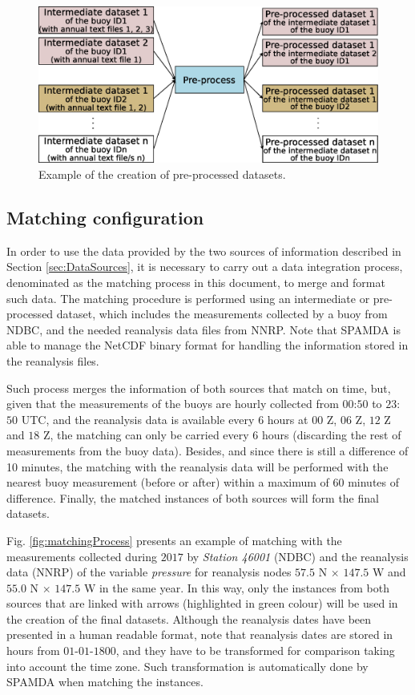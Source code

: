 \documentclass[review]{elsarticle}
\begin{document}
				\begin{figure}[ht!]
					\centering
					\includegraphics[scale=0.36]{figures/FigurePreprocess.eps}
					\caption{Example of the creation of pre-processed datasets.}
					\label{fig:preprocess}
				\end{figure}
				
				
			\subsection{Matching configuration}
			\label{sec:matching_conf}
			
				In order to use the data provided by the two sources of information described in Section \ref{sec:DataSources}, it is necessary to carry out a data integration process, denominated as the matching process in this document, to merge and format such data. The matching procedure is performed using an intermediate or pre-processed dataset, which includes the measurements collected by a buoy from NDBC, and the needed reanalysis data files from NNRP. Note that SPAMDA is able to manage the NetCDF binary format for handling the information stored in the reanalysis files.
				
				Such process merges the information of both sources that match on time, but, given that the measurements of the buoys are hourly collected from $00$:$50$ to $23$:$50$ UTC, and the reanalysis data is available every $6$ hours at $00$ Z, $06$ Z, $12$ Z and $18$ Z, the matching can only be carried every $6$ hours (discarding the rest of measurements from the buoy data). Besides, and since there is still a difference of 10 minutes, the matching with the reanalysis data will be performed with the nearest buoy measurement (before or after) within a maximum of 60 minutes of difference. Finally, the matched instances of both sources will form the final datasets.
				
				Fig. \ref{fig:matchingProcess} presents an example of matching with the measurements collected during $2017$ by \textit{Station 46001} (NDBC) and the reanalysis data (NNRP) of the variable \textit{pressure} for reanalysis nodes $57.5$ N $\times$ $147.5$ W and $55.0$ N $\times$ $147.5$ W in the same year. In this way, only the instances from both sources that are linked with arrows (highlighted in green colour) will be used in the creation of the final datasets. Although the reanalysis dates have been presented in a human readable format, note that reanalysis dates are stored in hours from $01$-$01$-$1800$, and they have to be transformed for comparison taking into account the time zone. Such transformation is automatically done by SPAMDA when matching the instances.
				
\end{document}
